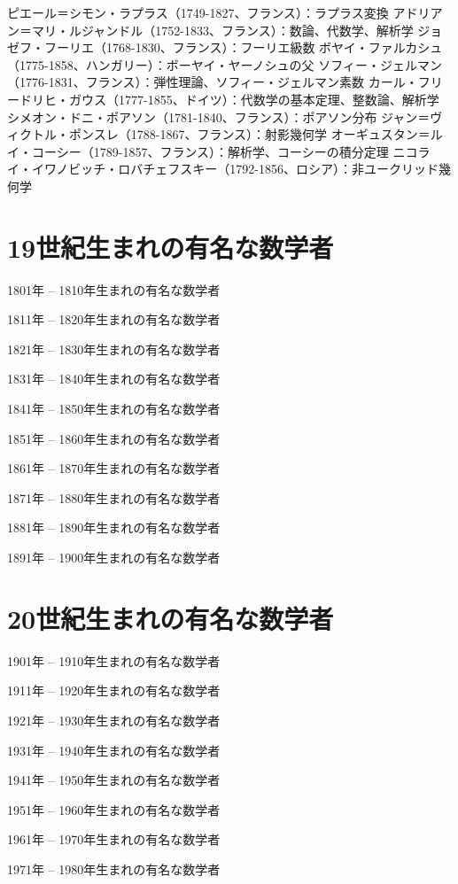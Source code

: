 \documentclass[a4paper,12pt,dvipdfmx]{jsarticle}
\theoremstyle{plain}
\theoremstyle{remark}  %
\theoremstyle{definition}  %
\begin{document}
ピエール＝シモン・ラプラス（1749-1827、フランス）：ラプラス変換
アドリアン＝マリ・ルジャンドル（1752-1833、フランス）：数論、代数学、解析学
ジョゼフ・フーリエ（1768-1830、フランス）：フーリエ級数
ボヤイ・ファルカシュ（1775-1858、ハンガリー）：ボーヤイ・ヤーノシュの父
ソフィー・ジェルマン（1776-1831、フランス）：弾性理論、ソフィー・ジェルマン素数
カール・フリードリヒ・ガウス（1777-1855、ドイツ）：代数学の基本定理、整数論、解析学
    シメオン・ドニ・ポアソン（1781-1840、フランス）：ポアソン分布
    ジャン＝ヴィクトル・ポンスレ（1788-1867、フランス）：射影幾何学
    オーギュスタン＝ルイ・コーシー（1789-1857、フランス）：解析学、コーシーの積分定理
    ニコライ・イワノビッチ・ロバチェフスキー（1792-1856、ロシア）：非ユークリッド幾何学
\section{19世紀生まれの有名な数学者}
1801年 -- 1810年生まれの有名な数学者

1811年 -- 1820年生まれの有名な数学者

1821年 -- 1830年生まれの有名な数学者

1831年 -- 1840年生まれの有名な数学者

1841年 -- 1850年生まれの有名な数学者

1851年 -- 1860年生まれの有名な数学者

1861年 -- 1870年生まれの有名な数学者

1871年 -- 1880年生まれの有名な数学者

1881年 -- 1890年生まれの有名な数学者

1891年 -- 1900年生まれの有名な数学者

\section{20世紀生まれの有名な数学者}
1901年 -- 1910年生まれの有名な数学者

1911年 -- 1920年生まれの有名な数学者

1921年 -- 1930年生まれの有名な数学者

1931年 -- 1940年生まれの有名な数学者

1941年 -- 1950年生まれの有名な数学者

1951年 -- 1960年生まれの有名な数学者

1961年 -- 1970年生まれの有名な数学者

1971年 -- 1980年生まれの有名な数学者




\end{document}
